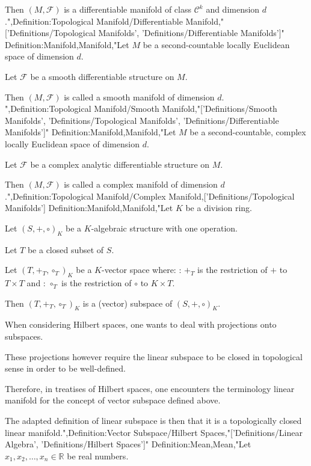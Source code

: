 Then $\left( M, \mathscr F \right)$ is a differentiable manifold of class $\mathcal C^k$ and dimension $d$.",Definition:Topological Manifold/Differentiable Manifold,"['Definitions/Topological Manifolds', 'Definitions/Differentiable Manifolds']"
Definition:Manifold,Manifold,"Let $M$ be a second-countable locally Euclidean space of dimension $d$. 

Let $\mathscr F$ be a smooth differentiable structure on $M$.


Then $\left( M, \mathscr F \right)$ is called a smooth manifold of dimension $d$.
",Definition:Topological Manifold/Smooth Manifold,"['Definitions/Smooth Manifolds', 'Definitions/Topological Manifolds', 'Definitions/Differentiable Manifolds']"
Definition:Manifold,Manifold,"Let $M$ be a second-countable, complex locally Euclidean space of dimension $d$. 

Let $\mathscr F$ be a complex analytic differentiable structure on $M$.


Then $\left( M, \mathscr F \right)$ is called a complex manifold of dimension $d$.",Definition:Topological Manifold/Complex Manifold,['Definitions/Topological Manifolds']
Definition:Manifold,Manifold,"Let $K$ be a division ring.

Let $\left({S, +, \circ}\right)_K$ be a $K$-algebraic structure with one operation.


Let $T$ be a closed subset of $S$.

Let $\left({T, +_T, \circ_T}\right)_K$ be a $K$-vector space where:
: $+_T$ is the restriction of $+$ to $T \times T$ and
: $\circ_T$ is the restriction of $\circ$ to $K \times T$.


Then $\left({T, +_T, \circ_T}\right)_K$ is a (vector) subspace of $\left({S, +, \circ}\right)_K$.


When considering Hilbert spaces, one wants to deal with projections onto subspaces.

These projections however require the linear subspace to be closed in topological sense in order to be well-defined.

Therefore, in treatises of Hilbert spaces, one encounters the terminology linear manifold for the concept of vector subspace defined above.

The adapted definition of linear subspace is then that it is a topologically closed linear manifold.",Definition:Vector Subspace/Hilbert Spaces,"['Definitions/Linear Algebra', 'Definitions/Hilbert Spaces']"
Definition:Mean,Mean,"Let $x_1, x_2, \ldots, x_n \in \mathbb R$ be real numbers.

